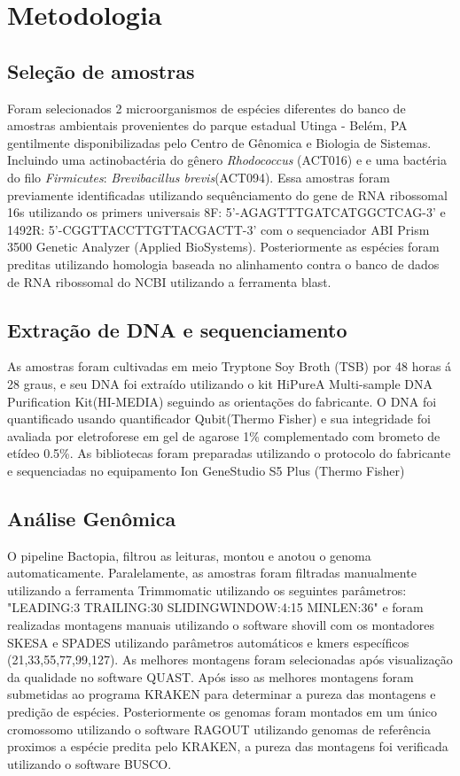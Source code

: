 \chapter{Metodologia}
\section{Seleção de amostras}
Foram selecionados 2 microorganismos de espécies diferentes do banco de amostras ambientais provenientes
do parque estadual Utinga - Belém, PA gentilmente disponibilizadas pelo Centro de Gênomica e Biologia de Sistemas.
Incluindo uma actinobactéria do gênero \textit{Rhodococcus} (ACT016) e e uma bactéria do filo \textit{Firmicutes}: \textit{Brevibacillus brevis}(ACT094).
Essa amostras foram previamente identificadas utilizando sequênciamento do gene de RNA ribossomal 16s
utilizando os primers universais 8F: 5'-AGAGTTTGATCATGGCTCAG-3' e 1492R: 5'-CGGTTACCTTGTTACGACTT-3' com o sequenciador 
ABI Prism 3500 Genetic Analyzer (Applied BioSystems). Posteriormente as espécies foram preditas utilizando
homologia baseada no alinhamento contra o banco de dados de RNA ribossomal do NCBI utilizando a ferramenta
blast.

\section{Extração de DNA e sequenciamento}
As amostras foram cultivadas em meio Tryptone Soy Broth (TSB) por 48 horas á 28 graus, e
seu DNA foi extraído utilizando o kit HiPureA Multi-sample DNA Purification Kit(HI-MEDIA) seguindo as orientações
do fabricante. O DNA foi quantificado usando quantificador Qubit(Thermo Fisher) e sua integridade foi 
avaliada por eletroforese em gel de agarose 1\% complementado com brometo de etídeo 0.5\%.
As bibliotecas foram preparadas utilizando o protocolo do fabricante e sequenciadas no equipamento
Ion GeneStudio S5 Plus (Thermo Fisher)

\section{Análise Genômica}
O pipeline Bactopia, filtrou as leituras, montou e anotou o genoma automaticamente.
Paralelamente, as amostras foram filtradas manualmente utilizando a ferramenta Trimmomatic
utilizando os seguintes parâmetros: "LEADING:3 TRAILING:30 SLIDINGWINDOW:4:15 MINLEN:36"
e foram realizadas montagens manuais utilizando o software shovill com os montadores SKESA e SPADES utilizando
parâmetros automáticos e kmers específicos (21,33,55,77,99,127).
As melhores montagens foram selecionadas após visualização da qualidade no software QUAST. 
Após isso as melhores montagens foram submetidas ao programa KRAKEN para determinar a pureza
das montagens e predição de espécies. Posteriormente os genomas foram montados em um único cromossomo
utilizando o software RAGOUT utilizando genomas de referência proximos a espécie predita pelo KRAKEN, 
a pureza das montagens foi verificada utilizando o software BUSCO.

